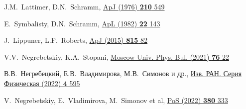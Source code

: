 \begin{thebibliography}{9}
J.M.~Lattimer, D.N.~Schramm, 
\href{https://doi.org/10.1086/154860}
  {ApJ  (1976) \textbf{210} 549}

E.~Symbalisty, D.N.~Schramm,  
\href{https://ui.adsabs.harvard.edu/abs/1982ApL....22..143S/abstract}
  {ApL (1982) \textbf{22} 143}

J.~Lippuner, L.F.~Roberts, 
\href{http://dx.doi.org/10.1088/0004-637X/815/2/82}
  {ApJ (2015) \textbf{815} 82}

V.V.~Negrebetskiy, K.A.~Stopani, 
\href{http://dx.doi.org/10.3103/S0027134921010082}
  {Moscow Univ. Phys. Bul. (2021) \textbf{76} 22}

В.В.~Негребецкий, Е.В.~Владимирова, М.В.~Симонов и др., 
\href{http://dx.doi.org/10.31857/S0367676522040184}
  {Изв. РАН. Серия Физическая (2022) \textbf{4} 595}

V.~Negrebetskiy, E.~Vladimirova, M.~Simonov et al,
\href{https://dx.doi.org/10.22323/1.380.0333 }
  {PoS (2022) \textbf{380} 333}
\end{thebibliography}
